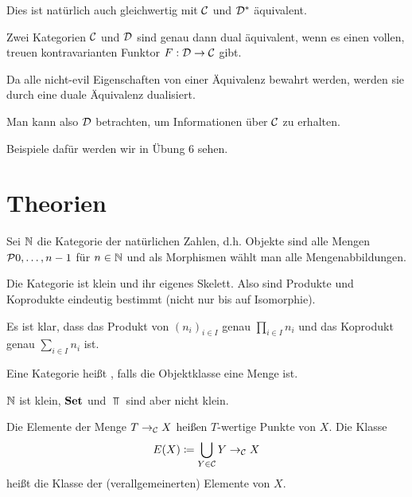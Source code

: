 \documentclass{book}
\begin{document}
\begin{remark}
    Dies ist natürlich auch gleichwertig mit $\mathcal{C}$ und $\mathcal{D}^{\ast}$ äquivalent.
\end{remark}

\begin{remark}
    Zwei Kategorien $\mathcal{C}$ und $\mathcal{D}$ sind genau dann dual äquivalent, wenn es einen vollen, treuen kontravarianten Funktor $F:\mathcal{D}\rightarrow\mathcal{C}$ gibt.
\end{remark}

Da alle nicht-evil Eigenschaften von einer Äquivalenz bewahrt werden, werden sie durch eine duale Äquivalenz dualisiert.

Man kann also $\mathcal{D}$ betrachten, um Informationen über $\mathcal{C}$ zu erhalten.

Beispiele dafür werden wir in Übung 6 sehen.

\section{ Theorien}

\begin{definition}
    Sei $\mathbb{N}$ die Kategorie der natürlichen Zahlen, d.h. Objekte sind alle Mengen
    $\set{0,\ldots,n-1}$
    für $n\in\mathbb{N}$ und als Morphismen wählt man alle Mengenabbildungen.
\end{definition}

\begin{remark}
    Die Kategorie ist klein und ihr eigenes Skelett. Also sind Produkte und Koprodukte eindeutig bestimmt (nicht nur bis auf Isomorphie).
\end{remark}

Es ist klar, dass das Produkt von ${(n_i)}_{i\in I}$ genau $\prod_{i\in I}{n_i}$ und das Koprodukt genau $\sum_{i\in I}{n_i}$ ist.

\begin{definition}
    Eine Kategorie heißt , falls die Objektklasse eine Menge ist.
\end{definition}

\begin{example}
    $\mathbb{N}$ ist klein, $\mathbf{Set}$ und $\Top$ sind aber nicht klein.
\end{example}

\begin{definition}[Elemente]
    Die Elemente der Menge $T\rightarrow_{\mathcal{C}} X$ heißen $T$-wertige Punkte von $X$. Die Klasse
    $$
    E(X)\mathrel{\mathrel{\mathop:}\mkern-1.2mu=}\bigcup_{Y\in \mathcal{C}}{Y\rightarrow_{\mathcal{C}} X} 
    $$
    heißt die Klasse der (verallgemeinerten) Elemente von $X$.
\end{definition}
\end{document}
